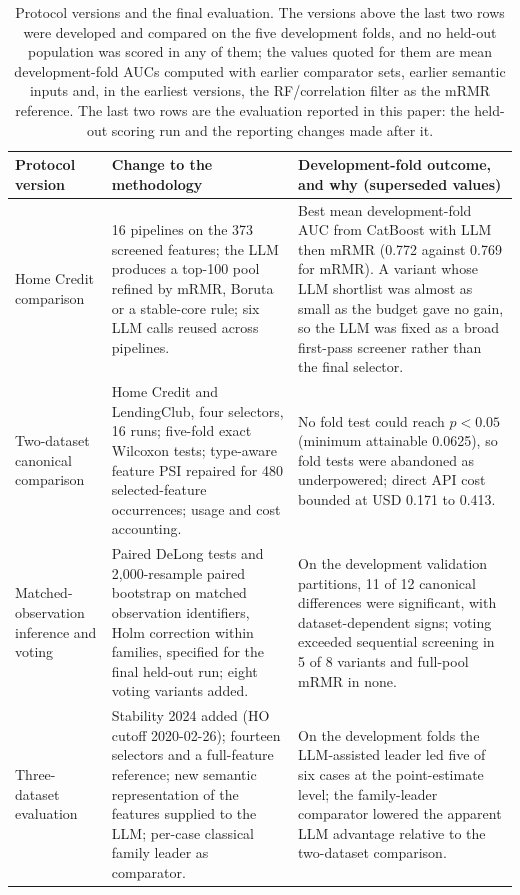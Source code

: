 \documentclass[final,5p,twocolumn]{elsarticle}
\begin{document}
\begin{table}[htbp]
\centering
\footnotesize
\setlength{\tabcolsep}{5pt}
\begin{threeparttable}
\caption{Protocol versions and the final evaluation. The versions above the last two rows were developed and compared on the five development folds, and no held-out population was scored in any of them; the values quoted for them are mean development-fold AUCs computed with earlier comparator sets, earlier semantic inputs and, in the earliest versions, the RF/correlation filter as the mRMR reference. The last two rows are the evaluation reported in this paper: the held-out scoring run and the reporting changes made after it.}
\label{tab:stages}
\begin{tabular}{@{}L{27mm}L{\dimexpr(\textwidth-27mm-4\tabcolsep)/2\relax}L{\dimexpr(\textwidth-27mm-4\tabcolsep)/2\relax}@{}}
\toprule
Protocol version & Change to the methodology & Development-fold outcome, and why (superseded values) \\
\midrule
Home Credit comparison & 16 pipelines on the 373 screened features; the LLM produces a top-100 pool refined by mRMR, Boruta or a stable-core rule; six LLM calls reused across pipelines. & Best mean development-fold AUC from CatBoost with LLM then mRMR (0.772 against 0.769 for mRMR). A variant whose LLM shortlist was almost as small as the budget gave no gain, so the LLM was fixed as a broad first-pass screener rather than the final selector. \\
\addlinespace
Two-dataset canonical comparison & Home Credit and LendingClub, four selectors, 16 runs; five-fold exact Wilcoxon tests; type-aware feature PSI repaired for 480 selected-feature occurrences; usage and cost accounting. & No fold test could reach $p<0.05$ (minimum attainable 0.0625), so fold tests were abandoned as underpowered; direct API cost bounded at USD 0.171 to 0.413. \\
\addlinespace
Matched-observation inference and voting & Paired DeLong tests and 2,000-resample paired bootstrap on matched observation identifiers, Holm correction within families, specified for the final held-out run; eight voting variants added. & On the development validation partitions, 11 of 12 canonical differences were significant, with dataset-dependent signs; voting exceeded sequential screening in 5 of 8 variants and full-pool mRMR in none. \\
\addlinespace
Three-dataset evaluation & Stability 2024 added (HO cutoff 2020-02-26); fourteen selectors and a full-feature reference; new semantic representation of the features supplied to the LLM; per-case classical family leader as comparator. & On the development folds the LLM-assisted leader led five of six cases at the point-estimate level; the family-leader comparator lowered the apparent LLM advantage relative to the two-dataset comparison. \\

\end{tabular}
\end{threeparttable}
\end{table}
\end{document}
